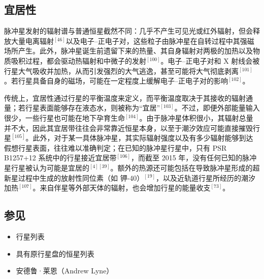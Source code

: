 \subsection{宜居性}
脉冲星发射的辐射谱与普通恒星截然不同：几乎不产生可见光或红外辐射，但会释放大量电离辐射$^{[46]}$以及电子–正电子对，这些粒子由脉冲星在自转过程中其强磁场所产生。此外，脉冲星诞生前遗留下来的热量、其自身辐射对两极的加热以及物质吸积过程，都会驱动热辐射和中微子的发射$^{[100]}$。电子–正电子对和 X 射线会被行星大气吸收并加热，从而引发强烈的大气逃逸，甚至可能将大气彻底剥离$^{[101]}$。若行星具备自身的磁场，可能在一定程度上缓解电子–正电子对的影响$^{[102]}$。

传统上，宜居性通过行星的平衡温度来定义，而平衡温度取决于其接收的辐射通量；若行星表面能够存在液态水，则被称为“宜居”$^{[103]}$。不过，即便外部能量输入很少，一些行星也可能在地下孕育生命$^{[104]}$。由于脉冲星体积很小，其辐射总量并不大，因此其宜居带往往会非常靠近恒星本身，以至于潮汐效应可能直接摧毁行星$^{[105]}$。此外，对于某一具体脉冲星，其实际辐射强度以及有多少辐射能够到达假想行星表面，往往难以准确判定；在已知的脉冲星行星中，只有 PSR B1257+12 系统中的行星接近宜居带$^{[106]}$，而截至 2015 年，没有任何已知的脉冲星行星被认为可能是宜居的$^{[4][39]}$。额外的热源还可能包括在导致脉冲星形成的超新星过程中生成的放射性同位素（如 钾-40）$^{[19]}$，以及近轨道行星所经历的潮汐加热$^{[107]}$。来自伴星等外部天体的辐射，也会增加行星的能量收支$^{[73]}$。
\subsection{参见}
\begin{itemize}
\item 行星列表
\item 具有原行星盘的恒星列表
\item 安德鲁·莱恩（Andrew Lyne）
\end{itemize}